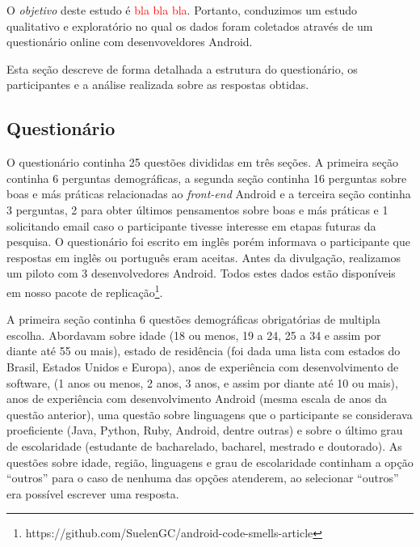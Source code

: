 O \emph{objetivo} deste estudo é \textcolor{red}{bla bla bla}. Portanto, conduzimos um estudo qualitativo e exploratório no qual os dados foram coletados através de um questionário online com desenvoveldores Android. 

 Esta seção descreve de forma detalhada a estrutura do questionário, os participantes e a análise realizada sobre as respostas obtidas.

\subsection{Questionário}
\label{sub:questionario}

O questionário continha 25 questões divididas em três seções. A primeira seção continha 6 perguntas demográficas, a segunda seção continha 16 perguntas sobre boas e más práticas relacionadas ao \textit{front-end} Android e a terceira seção continha 3 perguntas, 2 para obter últimos pensamentos sobre boas e más práticas e 1 solicitando email caso o participante tivesse interesse em etapas futuras da pesquisa. O questionário foi escrito em inglês porém informava o participante que respostas em inglês ou português eram aceitas. Antes da divulgação, realizamos um piloto com 3 desenvolvedores Android. Todos estes dados estão disponíveis em nosso pacote de replicação\footnote{https://github.com/SuelenGC/android-code-smells-article}.


A primeira seção continha 6 questões demográficas obrigatórias de multipla escolha. Abordavam sobre idade (18 ou menos, 19 a 24, 25 a 34 e assim por diante até 55 ou mais), estado de residência (foi dada uma lista com estados do Brasil, Estados Unidos e Europa), anos de experiência com desenvolvimento de software, (1 anos ou menos, 2 anos, 3 anos, e assim por diante até 10 ou mais), anos de experiência com desenvolvimento Android (mesma escala de anos da questão anterior), uma questão sobre linguagens que o participante se considerava proeficiente (Java, Python, Ruby, Android, dentre outras) e sobre o último grau de escolaridade (estudante de bacharelado, bacharel, mestrado e doutorado). As questões sobre idade, região, linguagens e grau de escolaridade continham a opção ``outros'' para o caso de nenhuma das opções atenderem, ao selecionar ``outros'' era possível escrever uma resposta.

